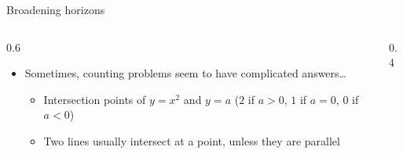 \documentclass{beamer}
\theoremstyle{definition}
\begin{document}
                                                \begin{frame}{Broadening horizons}

      \begin{columns}[c]
        \begin{column}{0.6\hsize}
      
          \begin{itemize}
          \item Sometimes, counting problems seem to have complicated answers\dots
            \begin{itemize}
            \item Intersection points of $y = x^2$ and $y=a$ ($2$ if $a>0$,
              $1$ if $a=0$, $0$ if $a<0$)
              \item Two lines usually intersect at a point, unless they are parallel
              \end{itemize}
          \end{itemize}
        \end{column}
        \begin{column}{0.4\hsize}


        \end{column}
      \end{columns}
                                                \end{frame}
\end{document}
